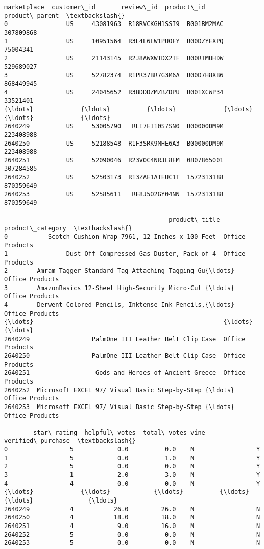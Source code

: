 \documentclass[11pt]{article}
\begin{document}
    \begin{Verbatim}[commandchars=\\\{\}]
        marketplace  customer\_id       review\_id  product\_id  product\_parent  \textbackslash{}
0                US     43081963  R18RVCKGH1SSI9  B001BM2MAC       307809868
1                US     10951564  R3L4L6LW1PUOFY  B00DZYEXPQ        75004341
2                US     21143145  R2J8AWXWTDX2TF  B00RTMUHDW       529689027
3                US     52782374  R1PR37BR7G3M6A  B00D7H8XB6       868449945
4                US     24045652  R3BDDDZMZBZDPU  B001XCWP34        33521401
{\ldots}             {\ldots}          {\ldots}             {\ldots}         {\ldots}             {\ldots}
2640249          US     53005790   RLI7EI10S7SN0  B00000DM9M       223408988
2640250          US     52188548  R1F3SRK9MHE6A3  B00000DM9M       223408988
2640251          US     52090046  R23V0C4NRJL8EM  0807865001       307284585
2640252          US     52503173  R13ZAE1ATEUC1T  1572313188       870359649
2640253          US     52585611   RE8J5O2GY04NN  1572313188       870359649

                                             product\_title product\_category  \textbackslash{}
0           Scotch Cushion Wrap 7961, 12 Inches x 100 Feet  Office Products
1                Dust-Off Compressed Gas Duster, Pack of 4  Office Products
2        Amram Tagger Standard Tag Attaching Tagging Gu{\ldots}  Office Products
3        AmazonBasics 12-Sheet High-Security Micro-Cut {\ldots}  Office Products
4        Derwent Colored Pencils, Inktense Ink Pencils,{\ldots}  Office Products
{\ldots}                                                    {\ldots}              {\ldots}
2640249                 PalmOne III Leather Belt Clip Case  Office Products
2640250                 PalmOne III Leather Belt Clip Case  Office Products
2640251                  Gods and Heroes of Ancient Greece  Office Products
2640252  Microsoft EXCEL 97/ Visual Basic Step-by-Step {\ldots}  Office Products
2640253  Microsoft EXCEL 97/ Visual Basic Step-by-Step {\ldots}  Office Products

        star\_rating  helpful\_votes  total\_votes vine verified\_purchase  \textbackslash{}
0                 5            0.0          0.0    N                 Y
1                 5            0.0          1.0    N                 Y
2                 5            0.0          0.0    N                 Y
3                 1            2.0          3.0    N                 Y
4                 4            0.0          0.0    N                 Y
{\ldots}             {\ldots}            {\ldots}          {\ldots}  {\ldots}               {\ldots}
2640249           4           26.0         26.0    N                 N
2640250           4           18.0         18.0    N                 N
2640251           4            9.0         16.0    N                 N
2640252           5            0.0          0.0    N                 N
2640253           5            0.0          0.0    N                 N


\end{Verbatim}
\end{document}
